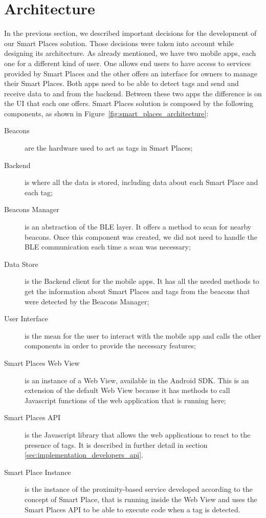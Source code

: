 \section{Architecture}
\label{sec:implementation_architecture}
In the previous section, we described important decisions for the development of our Smart Places solution. Those decisions were taken into account while designing its architecture.
As already mentioned, we have two mobile apps, each one for a different kind of user.
One allows end users to have access to services provided by Smart Places and the other offers an interface for owners to manage their Smart Places.
Both apps need to be able to detect tags and send and receive data to and from the backend.
Between these two apps the difference is on the \gls{UI} that each one offers.
Smart Places solution is composed by the following components, as shown in Figure~\ref{fig:smart_places_architecture}:
\begin{description}
  \item[Beacons]
  are the hardware used to act as tags in Smart Places;
  \item[Backend]
  is where all the data is stored, including data about each Smart Place and each tag;
  \item[Beacons Manager]
  is an abstraction of the \gls{BLE} layer.
  It offers a method to scan for nearby beacons. Once this component was created, we did not need to handle the \gls{BLE} communication each time a scan was necessary;
  \item[Data Store]
  is the Backend client for the mobile apps.
  It has all the needed methods to get the information about Smart Places and tags from the beacons that were detected by the Beacons Manager;
  \item[User Interface]
  is the mean for the user to interact with the mobile app and calls the other components in order to provide the necessary features;
  \item[Smart Places Web View]
  is an instance of a Web View, available in the Android \gls{SDK}.
  This is an extension of the default Web View because it has methods to call Javascript functions of the web application that is running here;
  \item[Smart Places \gls{API}]
  is the Javascript library that allows the web applications to react to the presence of tags.
  It is described in further detail in section \ref{sec:implementation_developers_api}.
  \item[Smart Place Instance]
  is the instance of the proximity-based service developed according to the concept of Smart Place, that is running inside the Web View and uses the Smart Places \gls{API} to be able to execute code when a tag is detected.
\end{description}

